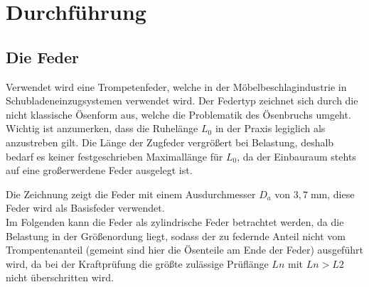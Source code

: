 \newpage
\section{Durchführung}
\label{sec:Durchfuehrung}

\subsection{Die Feder}
\label{sec:feder}
Verwendet wird eine Trompetenfeder, welche in der Möbelbeschlagindustrie in Schubladeneinzugsystemen
verwendet wird. 
Der Federtyp zeichnet sich durch die nicht klassische Ösenform aus, welche die Problematik des Ösenbruchs umgeht.\\

Wichtig ist anzumerken, dass die Ruhelänge $L_0$ in der Praxis legiglich als anzustreben gilt.
Die Länge der Zugfeder vergrößert bei Belastung, deshalb bedarf es keiner festgeschrieben Maximallänge für $L_0$, da
der Einbauraum stehts auf eine großerwerdene Feder ausgelegt ist.  

\begin{center}
\end{center}
Die Zeichnung zeigt die Feder mit einem Ausdurchmesser $D_a$ von $3,7\;\text{mm}$, diese Feder wird
als Basisfeder verwendet.\\ 

Im Folgenden kann die Feder als zylindrische Feder betrachtet werden,
da die Belastung in der Größenordung liegt, sodass der zu federnde Anteil nicht 
vom Trompentenanteil (gemeint sind hier die Ösenteile am Ende der Feder)
ausgeführt wird, da bei der Kraftprüfung die größte zulässige Prüflänge $Ln$ mit 
$Ln>L2$ nicht überschritten wird.

